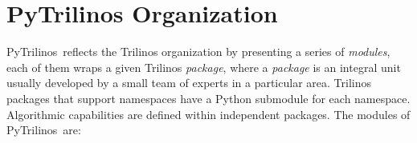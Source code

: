 \documentclass[10pt,relax]{SANDreport}
\newcommand{\PyTrilinos}{{PyTrilinos}}
\begin{document}
\section{PyTrilinos Organization}
\label{sec:organization}

\PyTrilinos\ reflects the Trilinos organization by presenting a series
of {\sl modules}, each of them wraps a given Trilinos {\sl package},
 where a {\sl package} is an integral unit usually
developed by a small team of experts in a particular area.
Trilinos packages that support namespaces have a Python submodule for
each namespace.  Algorithmic capabilities are defined within
independent packages. The modules of \PyTrilinos\ are:
\end{document}
